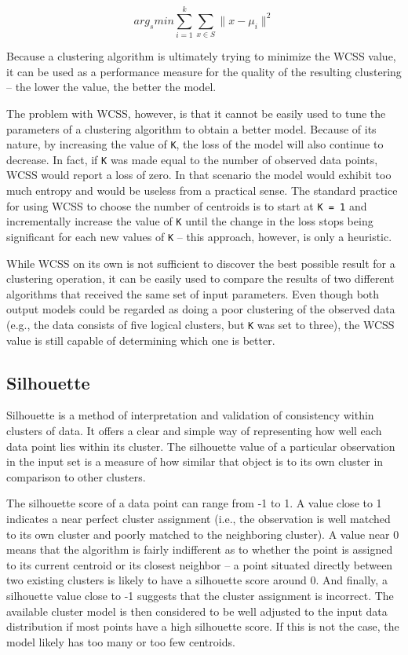 \documentclass{l4proj}
\begin{document}
$$arg_{s} min \sum_{i=1}^{k}\sum_{x \in S} \|x - \mu_{i} \|^{2}$$

\noindent Because a clustering algorithm is ultimately trying to minimize the WCSS value, it can be used as a performance measure for the quality of the resulting clustering -- the lower the value, the better the model.

The problem with WCSS, however, is that it cannot be easily used to tune the parameters of a clustering algorithm to obtain a better model. Because of its nature, by increasing the value of \texttt{K}, the loss of the model will also continue to decrease. In fact, if \texttt{K} was made equal to the number of observed data points, WCSS would report a loss of zero. In that scenario the model would exhibit too much entropy and would be useless from a practical sense. The standard practice for using WCSS to choose the number of centroids is to start at \texttt{K = 1} and incrementally increase the value of \texttt{K} until the change in the loss stops being significant for each new values of \texttt{K} -- this approach, however, is only a heuristic.

While WCSS on its own is not sufficient to discover the best possible result for a clustering operation, it can be easily used to compare the results of two different algorithms that received the same set of input parameters. Even though both output models could be regarded as doing a poor clustering of the observed data (e.g., the data consists of five logical clusters, but \texttt{K} was set to three), the WCSS value is still capable of determining which one is better.

\subsection{Silhouette}

Silhouette\cite{Silhouette} is a method of interpretation and validation of consistency within clusters of data. It offers a clear and simple way of representing how well each data point lies within its cluster. The silhouette value of a particular observation in the input set is a measure of how similar that object is to its own cluster in comparison to other clusters.

The silhouette score of a data point can range from -1 to 1. A value close to 1 indicates a near perfect cluster assignment (i.e., the observation is well matched to its own cluster and poorly matched to the neighboring cluster). A value near 0 means that the algorithm is fairly indifferent as to whether the point is assigned to its current centroid or its closest neighbor -- a point situated directly between two existing clusters is likely to have a silhouette score around 0. And finally, a silhouette value close to -1 suggests that the cluster assignment is incorrect. The available cluster model is then considered to be well adjusted to the input data distribution if most points have a high silhouette score. If this is not the case, the model likely has too many or too few centroids.
\end{document}
